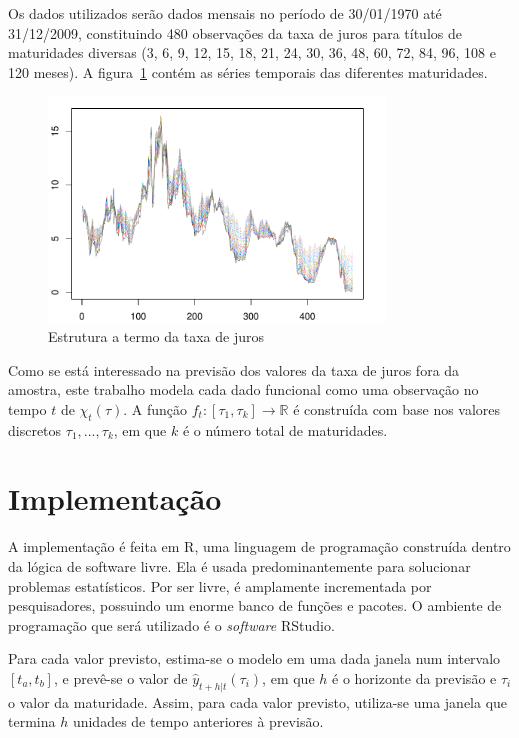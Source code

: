 \documentclass[
	12pt,				%
	openright,			%
	oneside,			%
	a4paper,			%
	english,			%
	brazil				%
	]{dissertacao-ufrgs-abntex2}
\begin{document}
Os dados utilizados serão dados mensais no período de 30/01/1970 até 31/12/2009,  constituindo 480 observações da taxa de juros para títulos de maturidades diversas (3, 6, 9, 12, 15, 18, 21, 24, 30, 36, 48, 60, 72, 84, 96, 108 e 120 meses). A figura~\ref{fig:est-termo} contém as séries temporais das diferentes maturidades.
\begin{figure}[h!] 
  \centering
    \includegraphics[width=0.8\textwidth]{anexos/taxas_juro}
  \caption{Estrutura a termo da taxa de juros}
  \label{fig:est-termo}
\end{figure}

Como se está interessado na previsão dos valores da taxa de juros fora da amostra, este trabalho modela cada dado funcional como uma observação no tempo $t$ de $\chi_t(\tau)$. A função $f_t:[\tau_1,\tau_k] \rightarrow \mathbb{R}$ é construída com base nos valores discretos ${\tau_1, ..., \tau_k}$, em que $k$ é o número total de maturidades. 

\section{Implementação}

A implementação é feita em R, uma linguagem de programação construída dentro da lógica de software livre. Ela é usada predominantemente para solucionar problemas estatísticos. Por ser livre, é amplamente incrementada por pesquisadores, possuindo um enorme banco de funções e pacotes. O ambiente de programação que será utilizado é o \emph{software} RStudio.

Para cada valor previsto, estima-se o modelo em uma dada janela num intervalo $[t_a,t_b]$, e prevê-se o valor de  $\hat{y}_{t+h|t}(\tau_i)$, em que $h$ é o horizonte da previsão e $\tau_i$ o valor da maturidade. Assim, para cada valor previsto, utiliza-se uma janela que termina $h$ unidades de tempo anteriores à previsão.
\end{document}
